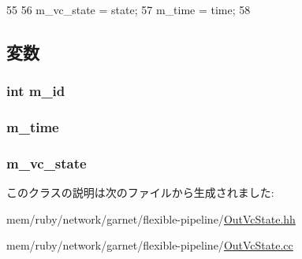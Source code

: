 \begin{DoxyCode}
55 {
56     m_vc_state = state;
57     m_time = time;
58 }
\end{DoxyCode}


\subsection{変数}
\hypertarget{classOutVcState_aad966617e7e050bedbead762727808a5}{
\subsubsection[{m\_\-id}]{\setlength{\rightskip}{0pt plus 5cm}int {\bf m\_\-id}}}
\label{classOutVcState_aad966617e7e050bedbead762727808a5}
\hypertarget{classOutVcState_ac39faf9ea84c2e7518ba2f960c661636}{
\subsubsection[{m\_\-time}]{ {\bf m\_\-time}}}
\label{classOutVcState_ac39faf9ea84c2e7518ba2f960c661636}
\hypertarget{classOutVcState_a86eb725d7cda610fb5009d20a3690a4d}{
\subsubsection[{m\_\-vc\_\-state}]{ {\bf m\_\-vc\_\-state}}}
\label{classOutVcState_a86eb725d7cda610fb5009d20a3690a4d}


このクラスの説明は次のファイルから生成されました:\begin{DoxyCompactItemize}
\item 
mem/ruby/network/garnet/flexible-\/pipeline/\hyperlink{OutVcState_8hh}{OutVcState.hh}\item 
mem/ruby/network/garnet/flexible-\/pipeline/\hyperlink{OutVcState_8cc}{OutVcState.cc}\end{DoxyCompactItemize}
